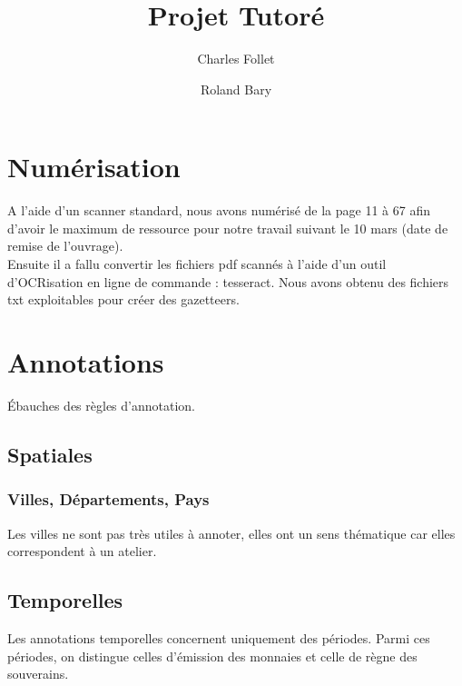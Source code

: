 \documentclass[a4paper, 11pt]{article}
\begin{document}
\title{Projet Tutoré}
\author{Charles Follet \and Roland Bary}
\maketitle
\tableofcontents
\newpage
\section{Numérisation}
A l'aide d'un scanner standard, nous avons numérisé de la page 11 à 67 afin d'avoir le maximum de ressource pour notre travail suivant le 10 mars (date de remise de l'ouvrage).\\
Ensuite il a fallu convertir les fichiers pdf scannés à l'aide d'un outil d'OCRisation en ligne de commande : tesseract. Nous avons obtenu des fichiers txt exploitables pour créer des gazetteers.
\section{Annotations}
Ébauches des règles d'annotation.
\subsection{Spatiales}
\subsubsection{Villes, Départements, Pays}
Les villes ne sont pas très utiles à annoter, elles ont un sens thématique car elles correspondent à un atelier.
\newpage
\subsection{Temporelles}
Les annotations temporelles concernent uniquement des périodes. Parmi ces périodes, on distingue celles d'émission des monnaies et celle de règne des souverains.
\end{document}
